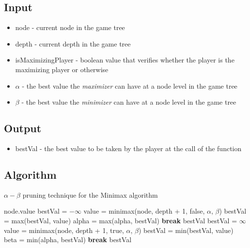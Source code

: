 \documentclass[12pt]{article}%
\begin{document}
  \subsection{Input}
    \begin{itemize}
      \item node - current node in the game tree
      \item depth - current depth in the game tree 
      \item isMaximizingPlayer - boolean value that verifies whether the player is the maximizing player or otherwise
      \item $\alpha$ - the best value the \textit{maximizer} can have at a node level in the game tree
      \item $\beta$ - the best value the \textit{minimizer} can have at a node level in the game tree
    \end{itemize}
  \subsection{Output}
    \begin{itemize}
      \item bestVal - the best value to be taken by the player at the call of the function 
    \end{itemize}
  \subsection{Algorithm \cite{gfg_ab}}
    \begin{algorithm}[H]
        \caption{$\alpha - \beta$ pruning technique for the Minimax algorithm}\label{cmp}
        \begin{algorithmic}[1]
            \State \Return node.value 
          \EndIf
            \State bestVal = $-\infty$
              \State value = minimax(node, depth + 1, false, $\alpha$, $\beta$)
              \State bestVal = max(bestVal, value) 
              \State alpha = max(alpha, bestVal)
              \If{$\beta <= \alpha$}
                \State \textbf{break}
              \EndIf 
            \EndFor
            \State \Return bestVal
          \Else 
              \State bestVal = $\infty$
                \State value = minimax(node, depth + 1, true, $\alpha$, $\beta$)
                \State bestVal = min(bestVal, value) 
                \State beta = min(alpha, bestVal)
                \If{$\beta <= \alpha$}
                  \State \textbf{break}
                \EndIf 
              \EndFor
              \State \Return bestVal
          \EndIf
        \EndFunction
      \end{algorithmic}
    \end{algorithm}
\end{document}
